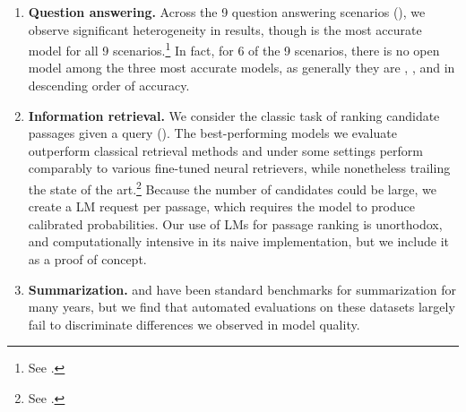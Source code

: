 \begin{enumerate}
    \item \textbf{Question answering.}
    Across the 9 \core question answering scenarios (), we observe significant heterogeneity in results, though \instructdavinci is the most accurate model for all 9 scenarios.\footnote{See .}
    In fact, for 6 of the 9 scenarios, there is no open model among the three most accurate models, as generally they are \instructdavinci, \anthropic, and \mtnlgfivethreezero in descending order of accuracy.
    
    \item \textbf{Information retrieval.}
    We consider the classic task of ranking candidate passages given a query ().
    The best-performing models we evaluate outperform classical retrieval methods and under some settings perform comparably to various fine-tuned neural retrievers, while nonetheless trailing the state of the art.\footnote{See .}
    Because the number of candidates could be large,
    we create a LM request per passage, which requires
    the model to produce calibrated probabilities.
    Our use of LMs for passage ranking is unorthodox,
    and computationally intensive in its naive implementation,
    but we include it as a proof of concept.
    
    \item \textbf{Summarization.}
    \cnndm and \xsum have been standard benchmarks for summarization for many years, but we find that automated evaluations on these datasets largely fail to discriminate differences we observed in model quality.
    

\end{enumerate}
